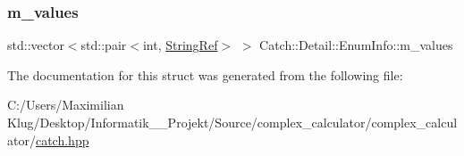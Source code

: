 \mbox{\label{struct_catch_1_1_detail_1_1_enum_info_ad65c0537a50d375859295a2c18ade489}} 
\subsubsection{\texorpdfstring{m\+\_\+values}{m\_values}}
{\footnotesize\ttfamily std\+::vector$<$std\+::pair$<$int, \mbox{\hyperlink{class_catch_1_1_string_ref}{String\+Ref}}$>$ $>$ Catch\+::\+Detail\+::\+Enum\+Info\+::m\+\_\+values}



The documentation for this struct was generated from the following file\+:\begin{DoxyCompactItemize}
\item 
C\+:/\+Users/\+Maximilian Klug/\+Desktop/\+Informatik\+\_\+\_\+\+Projekt/\+Source/complex\+\_\+calculator/complex\+\_\+calculator/\mbox{\hyperlink{catch_8hpp}{catch.\+hpp}}\end{DoxyCompactItemize}
